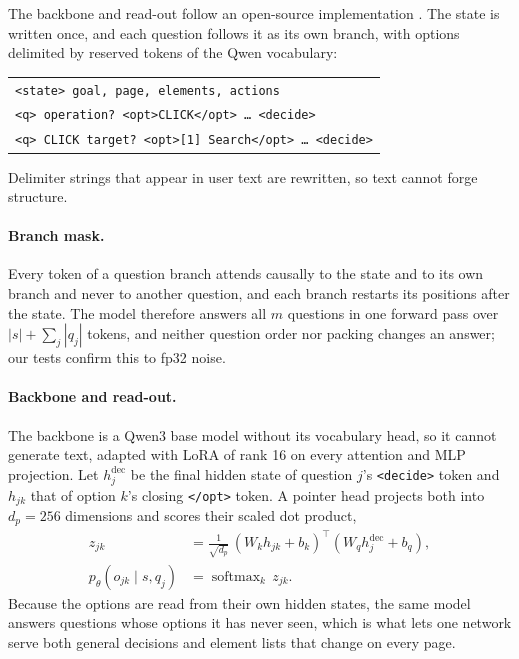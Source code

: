 \documentclass{article}
\begin{document}
The backbone and read-out follow an open-source implementation \citep{kev2026}. The state is written once, and each question follows it as
its own branch, with options delimited by reserved tokens of the Qwen vocabulary:
\begin{center}\scriptsize
\begin{tabular}{@{}l@{}}
\texttt{<state> goal, page, elements, actions}\\
\texttt{<q> operation? <opt>CLICK</opt> \dots\ <decide>}\\
\texttt{<q> CLICK target? <opt>[1] Search</opt> \dots\ <decide>}
\end{tabular}
\end{center}
Delimiter strings that appear in user text are rewritten, so text cannot forge structure.

\paragraph{Branch mask.} Every token of a question branch attends causally to the state and to its own branch and never
to another question, and each branch restarts its positions after the state. The model therefore answers all $m$
questions in one forward pass over $|s|+\sum_j|q_j|$ tokens, and neither question order nor packing changes an answer;
our tests confirm this to fp32 noise.

\paragraph{Backbone and read-out.} The backbone is a Qwen3 base model \citep{yang2025qwen3} without its vocabulary
head, so it cannot generate text, adapted with LoRA of rank 16 on every attention and MLP projection. Let
$h_{j}^{\mathrm{dec}}$ be the final hidden state of question $j$'s \texttt{<decide>} token and $h_{jk}$ that of
option $k$'s closing \texttt{</opt>} token. A pointer head projects both into $d_p=256$ dimensions and scores their scaled dot product,
\begin{align}
  z_{jk} &= \tfrac{1}{\sqrt{d_p}}\,(W_k h_{jk} + b_k)^{\top}(W_q h_{j}^{\mathrm{dec}} + b_q), \label{eq:score}\\
  p_\theta(o_{jk}\mid s,q_j) &= \operatorname{softmax}_k\, z_{jk}. \label{eq:pointer}
\end{align} Because the options are read from their own hidden states, the same model answers questions whose
options it has never seen, which is what lets one network serve both general decisions and element lists that change
on every page.
\end{document}
